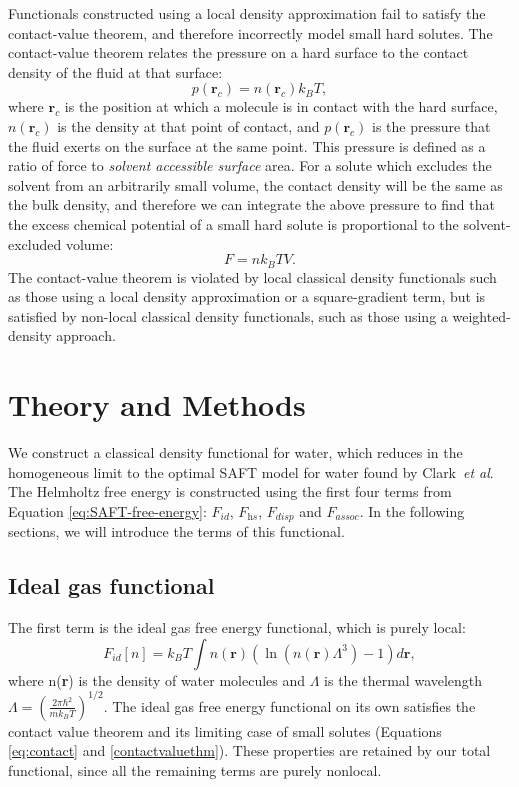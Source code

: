 \documentclass[twocolumn,amsmath,amssymb,prl]{revtex4-1}
\newcommand{\rr}{\textbf{r}}
\newcommand{\xx}{\textbf{r}}
\begin{document}
Functionals constructed using a local density approximation fail to
satisfy the contact-value theorem, and therefore incorrectly model
small hard solutes.  The contact-value theorem relates the pressure on
a hard surface to the contact density of the fluid at that
surface:
\begin{equation}\label{eq:contact}
  p(\rr_c) = n(\rr_c)k_BT,
\end{equation}
where $\rr_c$ is the position at which a molecule is in contact with
the hard surface, $n(\rr_c)$ is the density at that point of contact,
and $p(\rr_c)$ is the pressure that the fluid exerts on the surface at
the same point.  This pressure is defined as a ratio of force to
\emph{solvent accessible surface} area.
%
For a solute which excludes the solvent from an arbitrarily small
volume, the contact density will be the same as the bulk density, and
therefore we can integrate the above pressure to find that the excess
chemical potential of a small hard solute is proportional to the
solvent-excluded volume:
\begin{equation}\label{contactvaluethm}
  F = n k_BT V.
\end{equation}
The contact-value theorem is violated by local classical density
functionals such as those using a local density approximation or a
square-gradient term, but is satisfied by non-local classical density
functionals, such as those using a weighted-density approach.

\section{Theory and Methods}
We construct a classical density functional for water, which reduces
in the homogeneous limit to the optimal SAFT model for water found by
Clark~\emph{et al}.  The Helmholtz free energy is constructed using the
first four terms from Equation \ref{eq:SAFT-free-energy}: $F_\textit{id}$,
$F_\textit{hs}$, $F_\textit{disp}$ and $F_\textit{assoc}$.  In the
following sections, we will introduce the terms of this functional.

\subsection{Ideal gas functional}
The first term is the ideal gas free energy functional, which is
purely local:
\begin{equation}\label{idealgas}
  F_{id}[n] = k_B T \int n(\xx)\left( \ln({n(\xx){\Lambda}^3}) - 1\right) d\xx,
\end{equation}
where n(\xx) is the density of water molecules and $\Lambda$ is the
thermal wavelength
$ \Lambda = \left(\frac{2\pi\hbar^2}{mk_BT}\right )^{1/2}$.
The ideal gas free energy functional on its own satisfies the contact
value theorem and its limiting case of small solutes (Equations
\ref{eq:contact} and \ref{contactvaluethm}). These properties are
retained by our total functional, since all the remaining terms are
purely nonlocal.
\end{document}
